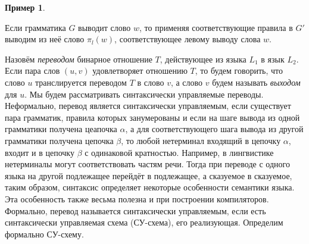 \documentclass[12pt]{article}
\theoremstyle{definiton}
\theoremstyle{definition}
\theoremstyle{definition}
\newtheorem{Example}{Пример}
\theoremstyle{definition}
\begin{document}
\begin{Example}
\begin{multicols}{2}
\begin{flushright}
				\end{flushright}	
	\end{multicols}
	
	Если грамматика $G$ выводит слово $w$, то применяя соответствующие правила в $G'$ выводим из неё слово $\pi_l(w)$, соответствующее левому выводу слова $w$.
\end{Example}
	Назовём \emph{переводом} бинарное отношение $T$, действующее из языка $L_1$ в язык $L_2$. Если пара слов $(u,v) $ удовлетворяет отношению $ T$, то будем говорить, что слово $u$ транслируется переводом $T$ в слово $v$, а слово $v$ будем называть \emph{выходом} для $u$. 
	Мы будем рассматривать синтаксически управляемые переводы. Неформально, перевод является синтаксически управляемым, если существует пара грамматик, правила которых занумерованы и если на шаге вывода из одной грамматики получена цеапочка $\alpha$, а для соответствующего шага вывода из другой грамматики получена цепочка $\beta$, то любой нетерминал входящий в цепочку $\alpha$, входит и в цепочку $\beta$ с одинаковой кратностью. Например, в лингвистике нетерминалы могут соответствовать частям речи. Тогда при переводе с одного языка на другой подлежащее перейдёт в подлежащее, а сказуемое в сказуемое, таким образом, синтаксис определяет некоторые особенности семантики языка. Эта особенность также весьма полезна и при построении компиляторов. Формально, перевод называется синтаксически управляемым, если есть синтаксически управляемая схема (СУ-схема), его реализующая. Определим формально СУ-схему.
\end{document}

